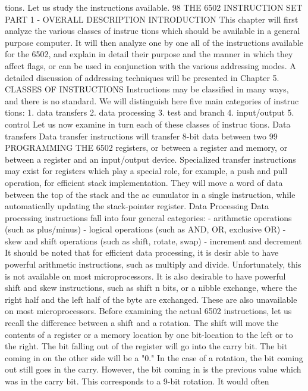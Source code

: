 \documentclass{book}
\begin{document}
tions. Let us study the instructions available.
98
THE 6502 INSTRUCTION SET
PART 1 - OVERALL DESCRIPTION
INTRODUCTION
This chapter will first analyze the various classes of instruc
tions which should be available in a general purpose computer. It
will then analyze one by one all of the instructions available for
the 6502, and explain in detail their purpose and the manner in
which they affect flags, or can be used in conjunction with the
various addressing modes. A detailed discussion of addressing
techniques will be presented in Chapter 5.
CLASSES OF INSTRUCTIONS
Instructions may be classified in many ways, and there is no
standard. We will distinguish here five main categories of instruc
tions:
1. data transfers
2. data processing
3. test and branch
4. input/output
5. control
Let us now examine in turn each of these classes of instruc
tions.
Data transfers
Data transfer instructions will transfer 8-bit data between two
99
PROGRAMMING THE 6502
registers, or between a register and memory, or between a register
and an input/output device. Specialized transfer instructions may
exist for registers which play a special role, for example, a push
and pull operation, for efficient stack implementation. They will
move a word of data between the top of the stack and the ac
cumulator in a single instruction, while automatically updating the
stack-pointer register.
Data Processing
Data processing instructions fall into four general categories:
- arithmetic operations (such as plus/minus)
- logical operations (such as AND, OR, exclusive OR)
- skew and shift operations (such as shift, rotate, swap)
- increment and decrement
It should be noted that for efficient data processing, it is desir
able to have powerful arithmetic instructions, such as multiply and
divide. Unfortunately, this is not available on most microprocessors.
It is also desirable to have powerful shift and skew instructions, such
as shift n bits, or a nibble exchange, where the right half and the
left half of the byte are exchanged. These are also unavailable on
most microprocessors.
Before examining the actual 6502 instructions, let us recall the
difference between a shift and a rotation. The shift will move the
contents of a register or a memory location by one bit-location to
the left or to the right. The bit falling out of the register will go
into the carry bit. The bit coming in on the other side will be a "0."
In the case of a rotation, the bit coming out still goes in the
carry. However, the bit coming in is the previous value which was
in the carry bit. This corresponds to a 9-bit rotation. It would often
\end{document}
